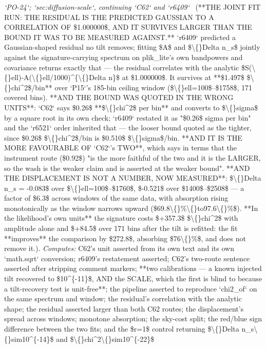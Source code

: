 \begin{description}
\textit{`PO-24`; `sec:diffusion-scale`, continuing `C62` and `r6409`} \ (**THE JOINT FIT RUN: THE RESIDUAL IS THE PREDICTED GAUSSIAN TO A CORRELATION OF \$1.000000\$, AND IT SURVIVES LARGER THAN THE BOUND IT WAS TO BE MEASURED AGAINST.** `r6409` predicted a Gaussian-shaped residual no tilt removes; fitting \$A\$ and \$\textbackslash\{\}Delta n\_s\$ jointly against the signature-carrying spectrum on plik\_lite's own bandpowers and covariance returns exactly that --- the residual correlates with the analytic \$S(\textbackslash\{\}ell)-A(\textbackslash\{\}ell/1000)\textasciicircum{}\{\textbackslash\{\}Delta n\}\$ at \$1.000000\$. It survives at **\$1.497\$ \$\textbackslash\{\}chi\textasciicircum{}2\$/bin** over `P15`'s 185-bin ceiling window (\$\textbackslash\{\}ell=100\$--\$1758\$, 171 covered bins).  **AND THE BOUND WAS QUOTED IN THE WRONG UNITS**: `C62` says \$0.26\$ **\$\textbackslash\{\}chi\textasciicircum{}2\$ per bin** and converts to \$\textbackslash\{\}sigma\$ by a square root in its own check; `r6409` restated it as "\$0.26\$ sigma per bin" and the `r6521` order inherited that --- the looser bound quoted as the tighter, since \$0.26\$ \$\textbackslash\{\}chi\textasciicircum{}2\$/bin is \$0.510\$ \$\textbackslash\{\}sigma\$/bin.  **AND IT IS THE MORE FAVOURABLE OF `C62`'s TWO**, which says in terms that the instrument route (\$0.92\$) "is the more faithful of the two and it is the LARGER, so the wash is the weaker claim and is asserted at the weaker bound".  **AND THE DISPLACEMENT IS NOT A NUMBER, NOW MEASURED**: \$\textbackslash\{\}Delta n\_s = -0.083\$ over \$\textbackslash\{\}ell=100\$--\$1760\$, \$-0.521\$ over \$1400\$--\$2508\$ --- a factor of \$6.3\$ across windows of the same data, with absorption rising monotonically as the window narrows upward (\$69.8\textbackslash\{\}\%\textbackslash\{\}to97.6\textbackslash\{\}\%\$). **In the likelihood's own units** the signature costs \$+357.3\$ \$\textbackslash\{\}chi\textasciicircum{}2\$ with amplitude alone and \$+84.5\$ over 171 bins after the tilt is refitted: the fit **improves** the comparison by \$272.8\$, absorbing \$76\textbackslash\{\}\%\$, and does not remove it.). 
\emph{Computes:} C62's unit asserted from its own text and its own `math.sqrt` conversion; r6409's restatement asserted; C62's two-route sentence asserted after stripping comment markers; **two calibrations --- a known injected tilt recovered to \$10\textasciicircum{}\{-11\}\$, AND the SCALE, which the first is blind to because a tilt-recovery test is unit-free**; the pipeline asserted to reproduce `chi2\_of` on the same spectrum and window; the residual's correlation with the analytic shape; the residual asserted larger than both C62 routes; the displacement's spread across windows; monotone absorption; the sky-cost split; the red/blue sign difference between the two fits; and the \$r=1\$ control returning \$\textbackslash\{\}Delta n\_s\textbackslash\{\}sim10\textasciicircum{}\{-14\}\$ and \$\textbackslash\{\}chi\textasciicircum{}2\textbackslash\{\}sim10\textasciicircum{}\{-22\}\$

\end{description}
